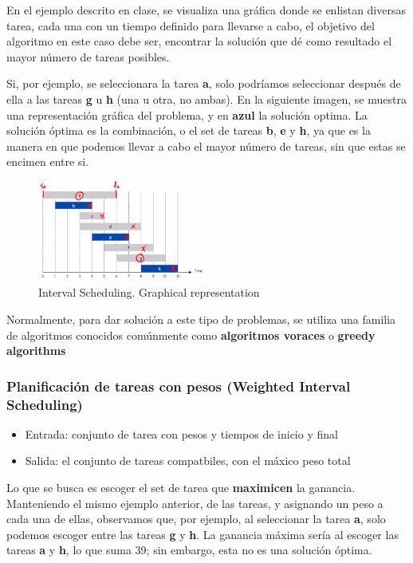 \documentclass[letterpaper, 12pt]{article}
\begin{document}
En el ejemplo descrito en clase, se visualiza una gráfica donde se enlistan
diversas tarea, cada una con un tiempo definido para llevarse a cabo, el
objetivo del algoritmo en este caso debe ser, encontrar la solución que dé como
resultado el mayor número de tareas posibles.

Si, por ejemplo, se seleccionara la tarea \textbf{a}, solo podríamos seleccionar
después de ella a las tareas \textbf{g} u \textbf{h} (una u otra, no ambas). En la siguiente
imagen, se muestra una representación gráfica del problema, y en \textbf{azul} la
solución optima. La solución óptima es la combinación, o el set de tareas
\textbf{b}, \textbf{e} y \textbf{h}, ya que es la manera en que podemos llevar a cabo el mayor número
de tareas, sin que estas se encimen entre si.

\begin{figure}[htbp!]
\centering
\includegraphics[keepaspectratio,width=0.5\textwidth]{./img/interval_scheduling.png}
\caption{\label{fig:interval_scheduling}Interval Scheduling. Graphical representation}
\end{figure}

Normalmente, para dar solución a este tipo de problemas, se utiliza una familia
de algoritmos conocidos comúnmente como \textbf{algoritmos voraces} o \textbf{greedy
algorithms}

\subsubsection{Planificación de tareas con pesos (Weighted Interval Scheduling)}
\label{sec:org15f2b9b}
\begin{itemize}
\item Entrada: conjunto de tarea con pesos y tiempos de inicio y final
\item Salida: el conjunto de tareas compatbiles, con el máxico peso total
\end{itemize}

Lo que se busca es escoger el set de tarea que \textbf{maximicen} la ganancia.
Manteniendo el mismo ejemplo anterior, de las tareas, y asignando un peso a
cada una de ellas, observamos que, por ejemplo, al seleccionar la tarea \textbf{a},
solo podemos escoger entre las tareas \textbf{g} y \textbf{h}. La ganancia máxima sería al
escoger las tareas \textbf{a} y \textbf{h}, lo que suma 39; sin embargo, esta no es una
solución óptima.
\end{document}
